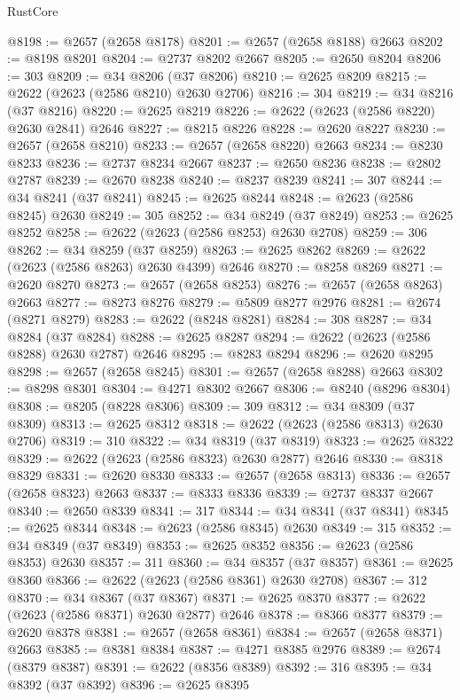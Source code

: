 \begin{lexlean}{RustCore}
\begin{coremodule}
@8198 := @2657 (@2658 @8178)
@8201 := @2657 (@2658 @8188) @2663
@8202 := @8198 @8201
@8204 := @2737 @8202 @2667
@8205 := @2650 @8204
@8206 := 303
@8209 := @34 @8206 (@37 @8206)
@8210 := @2625 @8209
@8215 := @2622 (@2623 (@2586 @8210) @2630 @2706)
@8216 := 304
@8219 := @34 @8216 (@37 @8216)
@8220 := @2625 @8219
@8226 := @2622 (@2623 (@2586 @8220) @2630 @2841) @2646
@8227 := @8215 @8226
@8228 := @2620 @8227
@8230 := @2657 (@2658 @8210)
@8233 := @2657 (@2658 @8220) @2663
@8234 := @8230 @8233
@8236 := @2737 @8234 @2667
@8237 := @2650 @8236
@8238 := @2802 @2787
@8239 := @2670 @8238
@8240 := @8237 @8239
@8241 := 307
@8244 := @34 @8241 (@37 @8241)
@8245 := @2625 @8244
@8248 := @2623 (@2586 @8245) @2630
@8249 := 305
@8252 := @34 @8249 (@37 @8249)
@8253 := @2625 @8252
@8258 := @2622 (@2623 (@2586 @8253) @2630 @2708)
@8259 := 306
@8262 := @34 @8259 (@37 @8259)
@8263 := @2625 @8262
@8269 := @2622 (@2623 (@2586 @8263) @2630 @4399) @2646
@8270 := @8258 @8269
@8271 := @2620 @8270
@8273 := @2657 (@2658 @8253)
@8276 := @2657 (@2658 @8263) @2663
@8277 := @8273 @8276
@8279 := @5809 @8277 @2976
@8281 := @2674 (@8271 @8279)
@8283 := @2622 (@8248 @8281)
@8284 := 308
@8287 := @34 @8284 (@37 @8284)
@8288 := @2625 @8287
@8294 := @2622 (@2623 (@2586 @8288) @2630 @2787) @2646
@8295 := @8283 @8294
@8296 := @2620 @8295
@8298 := @2657 (@2658 @8245)
@8301 := @2657 (@2658 @8288) @2663
@8302 := @8298 @8301
@8304 := @4271 @8302 @2667
@8306 := @8240 (@8296 @8304)
@8308 := @8205 (@8228 @8306)
@8309 := 309
@8312 := @34 @8309 (@37 @8309)
@8313 := @2625 @8312
@8318 := @2622 (@2623 (@2586 @8313) @2630 @2706)
@8319 := 310
@8322 := @34 @8319 (@37 @8319)
@8323 := @2625 @8322
@8329 := @2622 (@2623 (@2586 @8323) @2630 @2877) @2646
@8330 := @8318 @8329
@8331 := @2620 @8330
@8333 := @2657 (@2658 @8313)
@8336 := @2657 (@2658 @8323) @2663
@8337 := @8333 @8336
@8339 := @2737 @8337 @2667
@8340 := @2650 @8339
@8341 := 317
@8344 := @34 @8341 (@37 @8341)
@8345 := @2625 @8344
@8348 := @2623 (@2586 @8345) @2630
@8349 := 315
@8352 := @34 @8349 (@37 @8349)
@8353 := @2625 @8352
@8356 := @2623 (@2586 @8353) @2630
@8357 := 311
@8360 := @34 @8357 (@37 @8357)
@8361 := @2625 @8360
@8366 := @2622 (@2623 (@2586 @8361) @2630 @2708)
@8367 := 312
@8370 := @34 @8367 (@37 @8367)
@8371 := @2625 @8370
@8377 := @2622 (@2623 (@2586 @8371) @2630 @2877) @2646
@8378 := @8366 @8377
@8379 := @2620 @8378
@8381 := @2657 (@2658 @8361)
@8384 := @2657 (@2658 @8371) @2663
@8385 := @8381 @8384
@8387 := @4271 @8385 @2976
@8389 := @2674 (@8379 @8387)
@8391 := @2622 (@8356 @8389)
@8392 := 316
@8395 := @34 @8392 (@37 @8392)
@8396 := @2625 @8395

\end{coremodule}
\end{lexlean}
